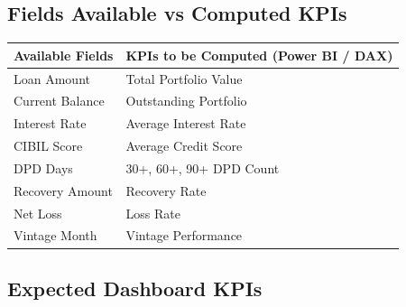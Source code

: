 \vspace{0.7cm}


\subsection*{Fields Available vs Computed KPIs}

\renewcommand{\arraystretch}{1.4}

\begin{tabularx}{\textwidth}{|X|X|}
	\hline
	\rowcolor{TableHeader}
	\textbf{Available Fields} &
	\textbf{KPIs to be Computed (Power BI / DAX)}
	\\
	\hline
	
	Loan Amount &
	Total Portfolio Value
	\\
	\hline
	
	Current Balance &
	Outstanding Portfolio
	\\
	\hline
	
	Interest Rate &
	Average Interest Rate
	\\
	\hline
	
	CIBIL Score &
	Average Credit Score
	\\
	\hline
	
	DPD Days &
	30+, 60+, 90+ DPD Count
	\\
	\hline
	
	Recovery Amount &
	Recovery Rate
	\\
	\hline
	
	Net Loss &
	Loss Rate
	\\
	\hline
	
	Vintage Month &
	Vintage Performance
	\\
	\hline
	
\end{tabularx}

\vspace{0.7cm}


\subsection*{Expected Dashboard KPIs}

